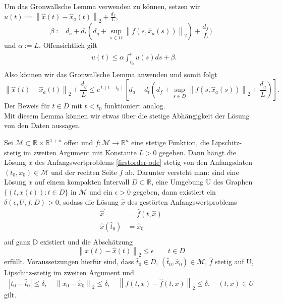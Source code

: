 Um das Gronwallsche Lemma verwenden zu können, setzen wir
$u(t):=\left\lVert \hat{x}(t) - \hat{x}_a(t)\right\rVert_2 + \frac{d_f}{L}$,
\[
    \beta:=d_a + d_t(d_g + \sup_{s\in D}\left\lVert f(s,\hat{x}_a(s)) \right\rVert_2) + \frac{d_f}{L})
\] und $\alpha:=L$.
Offensichtlich gilt
\begin{align*}
    &u(t) \leq \alpha \int_{t_0}^{t} u(s) ds + \beta.\\
\end{align*}
Also können wir das Gronwallsche Lemma anwenden und somit folgt
\[
    \left\lVert \hat{x}(t) - \hat{x}_a(t)\right\rVert_2 + \frac{d_g}{L} \leq
    e^{L(t-t_0)}\left[d_a + d_t(d_f + \sup_{s\in D}\left\lVert f(s,\hat{x}_a(s)) \right\rVert_2 + \frac{d_g}{L})\right].
\]
Der Beweis für $t \in D$ mit $t<t_0$ funktioniert analog. \qedwhite\\
Mit diesem Lemma können wir etwas über die stetige Abhängigkeit der Lösung von den Daten aussagen.
\begin{satz}
    \label{Satz-stet-abh}
    Sei $\mathcal{M} \subset \mathbb{R} \times \mathbb{R}^{1+n}$ offen und $f:\mathcal{M} \rightarrow \mathbb{R}^{n}$
    eine stetige Funktion, die Lipschitz-stetig im zweiten Argument mit Konstante $L>0$ gegeben. Dann hängt die
    Lösung $x$ des Anfangswertproblems \eqref{firstorder-ode} stetig von den Anfangsdaten $(t_0, x_0) \in \mathcal{M}$
    und der rechten Seite $f$ ab. Darunter versteht man:
    sind eine Lösung $x$ auf einem kompakten Intervall $D \subset \mathbb{R}$, eine Umgebung U des Graphen
    $\{(t,x(t)): t \in D\}$ in $\mathcal{M}$ und ein $\epsilon>0$ gegeben, dann existiert ein
    $\delta(\epsilon, U, f, D) >0$, sodass die Lösung $\hat{x}$ des gestörten Anfangswertproblems
    \begin{align*}
        \hat{x}^{\prime} &= \hat{f}(t,\hat{x})\\
        \hat{x}(\hat{t}_0) &= \hat{x}_0 \\
    \end{align*}
    auf ganz D existiert und die Abschätzung
    \[
        \left\lVert x(t) - \hat{x}(t) \right\rVert_2 \leq \epsilon \qquad t \in D
    \]
    erfüllt. Voraussetzungen hierfür sind, dass $\hat{t}_0 \in D$, $(\hat{t}_0, \hat{x}_0) \in \mathcal{M}$, $\hat{f}$
    stetig auf U, Lipschitz-stetig im zweiten Argument und
    \[
        |t_0 - \hat{t}_0| \leq \delta, \quad \left\lVert x_0 - \hat{x}_0 \right\rVert_2 \leq \delta, \quad
        \left\lVert f(t,x) - \hat{f}(t,x) \right\rVert_2 \leq \delta, \quad (t,x) \in U
    \] gilt.
\end{satz}
